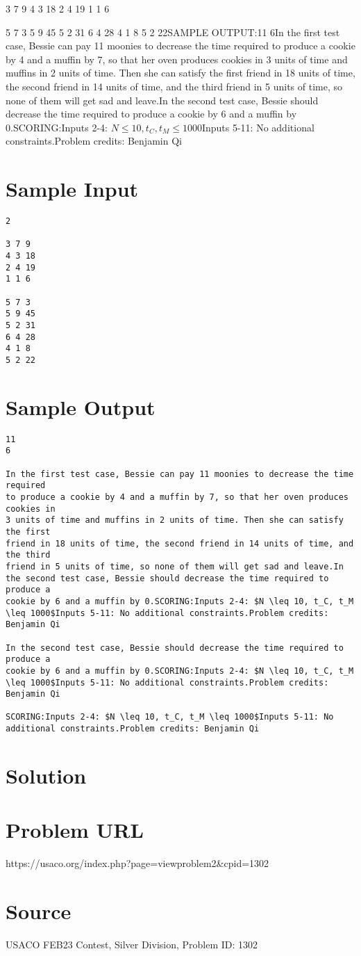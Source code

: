 \documentclass[12pt]{article}
\begin{document}
3 7 9
4 3 18
2 4 19
1 1 6

5 7 3
5 9 45
5 2 31
6 4 28
4 1 8
5 2 22SAMPLE OUTPUT:11
6In the first test case, Bessie can pay 11 moonies to decrease the time required
to produce a cookie by 4 and a muffin by 7, so that her oven produces cookies in
3 units of time and muffins in 2 units of time. Then she can satisfy the first
friend in 18 units of time, the second friend in 14 units of time, and the third
friend in 5 units of time, so none of them will get sad and leave.In the second test case, Bessie should decrease the time required to produce a
cookie by 6 and a muffin by 0.SCORING:Inputs 2-4: $N \leq 10, t_C, t_M \leq 1000$Inputs 5-11: No additional constraints.Problem credits: Benjamin Qi

\section*{Sample Input}
\begin{verbatim}
2

3 7 9
4 3 18
2 4 19
1 1 6

5 7 3
5 9 45
5 2 31
6 4 28
4 1 8
5 2 22
\end{verbatim}

\section*{Sample Output}
\begin{verbatim}
11
6

In the first test case, Bessie can pay 11 moonies to decrease the time required
to produce a cookie by 4 and a muffin by 7, so that her oven produces cookies in
3 units of time and muffins in 2 units of time. Then she can satisfy the first
friend in 18 units of time, the second friend in 14 units of time, and the third
friend in 5 units of time, so none of them will get sad and leave.In the second test case, Bessie should decrease the time required to produce a
cookie by 6 and a muffin by 0.SCORING:Inputs 2-4: $N \leq 10, t_C, t_M \leq 1000$Inputs 5-11: No additional constraints.Problem credits: Benjamin Qi

In the second test case, Bessie should decrease the time required to produce a
cookie by 6 and a muffin by 0.SCORING:Inputs 2-4: $N \leq 10, t_C, t_M \leq 1000$Inputs 5-11: No additional constraints.Problem credits: Benjamin Qi

SCORING:Inputs 2-4: $N \leq 10, t_C, t_M \leq 1000$Inputs 5-11: No additional constraints.Problem credits: Benjamin Qi
\end{verbatim}

\section*{Solution}


\section*{Problem URL}
https://usaco.org/index.php?page=viewproblem2&cpid=1302

\section*{Source}
USACO FEB23 Contest, Silver Division, Problem ID: 1302
\end{document}
